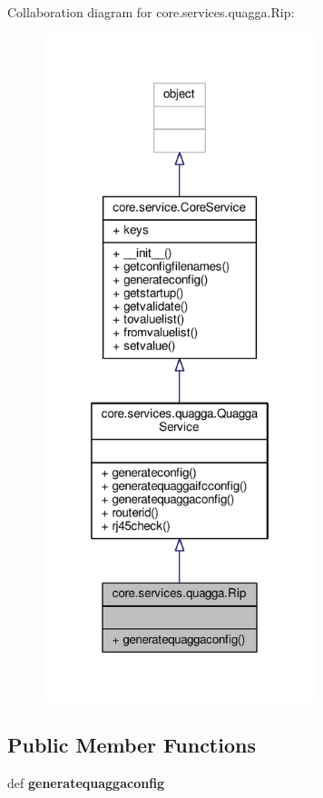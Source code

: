 Collaboration diagram for core.\+services.\+quagga.\+Rip\+:
\nopagebreak
\begin{figure}[H]
\begin{center}
\leavevmode
\includegraphics[height=550pt]{classcore_1_1services_1_1quagga_1_1_rip__coll__graph}
\end{center}
\end{figure}
\subsection*{Public Member Functions}
\begin{DoxyCompactItemize}
\item 
\hypertarget{classcore_1_1services_1_1quagga_1_1_rip_a6c0eb906fc44939aaec52017fba34185}{def {\bfseries generatequaggaconfig}}\label{classcore_1_1services_1_1quagga_1_1_rip_a6c0eb906fc44939aaec52017fba34185}

\end{DoxyCompactItemize}
